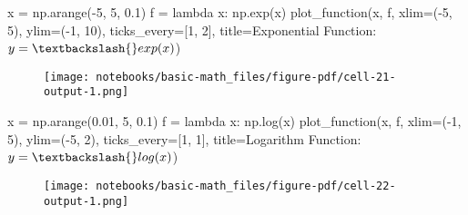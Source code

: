 \documentclass[
  letterpaper,
  DIV=11,
  numbers=noendperiod]{scrreprt}
\newenvironment{Shaded}{\begin{snugshade}}{\end{snugshade}}
\newcommand{\DecValTok}[1]{\textcolor[rgb]{0.68,0.00,0.00}{#1}}
\newcommand{\FloatTok}[1]{\textcolor[rgb]{0.68,0.00,0.00}{#1}}
\newcommand{\KeywordTok}[1]{\textcolor[rgb]{0.00,0.23,0.31}{#1}}
\newcommand{\NormalTok}[1]{\textcolor[rgb]{0.00,0.23,0.31}{#1}}
\newcommand{\OperatorTok}[1]{\textcolor[rgb]{0.37,0.37,0.37}{#1}}
\newcommand{\StringTok}[1]{\textcolor[rgb]{0.13,0.47,0.30}{#1}}
\begin{document}
\begin{Shaded}
\begin{Highlighting}[]
\NormalTok{x }\OperatorTok{=}\NormalTok{ np.arange(}\OperatorTok{{-}}\DecValTok{5}\NormalTok{, }\DecValTok{5}\NormalTok{, }\FloatTok{0.1}\NormalTok{)}
\NormalTok{f }\OperatorTok{=} \KeywordTok{lambda}\NormalTok{ x: np.exp(x)}
\NormalTok{plot\_function(x, f, xlim}\OperatorTok{=}\NormalTok{(}\OperatorTok{{-}}\DecValTok{5}\NormalTok{, }\DecValTok{5}\NormalTok{), ylim}\OperatorTok{=}\NormalTok{(}\OperatorTok{{-}}\DecValTok{1}\NormalTok{, }\DecValTok{10}\NormalTok{), ticks\_every}\OperatorTok{=}\NormalTok{[}\DecValTok{1}\NormalTok{, }\DecValTok{2}\NormalTok{], }
\NormalTok{              title}\OperatorTok{=}\StringTok{\textquotesingle{}Exponential Function: $y=\textbackslash{}exp(x)$\textquotesingle{}}\NormalTok{)}
\end{Highlighting}
\end{Shaded}

\begin{figure}[H]

{\centering \texttt{[image: notebooks/basic-math\_files/figure-pdf/cell-21-output-1.png]}

}

\end{figure}

\begin{Shaded}
\begin{Highlighting}[]
\NormalTok{x }\OperatorTok{=}\NormalTok{ np.arange(}\FloatTok{0.01}\NormalTok{, }\DecValTok{5}\NormalTok{, }\FloatTok{0.1}\NormalTok{)}
\NormalTok{f }\OperatorTok{=} \KeywordTok{lambda}\NormalTok{ x: np.log(x)}
\NormalTok{plot\_function(x, f, xlim}\OperatorTok{=}\NormalTok{(}\OperatorTok{{-}}\DecValTok{1}\NormalTok{, }\DecValTok{5}\NormalTok{), ylim}\OperatorTok{=}\NormalTok{(}\OperatorTok{{-}}\DecValTok{5}\NormalTok{, }\DecValTok{2}\NormalTok{), ticks\_every}\OperatorTok{=}\NormalTok{[}\DecValTok{1}\NormalTok{, }\DecValTok{1}\NormalTok{], }
\NormalTok{              title}\OperatorTok{=}\StringTok{\textquotesingle{}Logarithm Function: $y=\textbackslash{}log(x)$\textquotesingle{}}\NormalTok{)}
\end{Highlighting}
\end{Shaded}

\begin{figure}[H]

{\centering \texttt{[image: notebooks/basic-math\_files/figure-pdf/cell-22-output-1.png]}

}

\end{figure}
\end{document}
